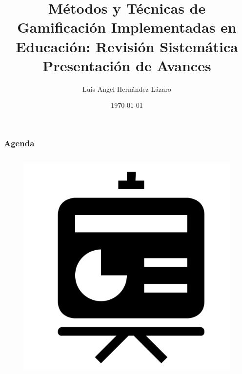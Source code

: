 \documentclass{beamer}
\title[Gamificación]{Métodos y Técnicas de Gamificación Implementadas en Educación: Revisión Sistemática\\ Presentación de Avances} %
\author{Luis Angel Hernández Lázaro} %
\institute[CIMAT] %
{
Centro de Investigación en Matemáticas A.C. Unidad Zacatecas \\ %
\medskip
\textit{luis.hernandez@cimat.com} %
}
\date{\today} %
\begin{document}
\begin{frame}
\titlepage
\end{frame}

\begin{frame}
\frametitle{Agenda}

\begin{columns}[c] %
	
	\begin{figure}
		\begin{center}
			\includegraphics[scale=0.25]{images/2icons/content.png}
		\end{center}
	\end{figure}
	
	\tableofcontents 
	
\end{columns}
\end{frame}

\end{document}
